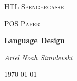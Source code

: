 \documentclass[12pt,a4paper]{report}
\begin{document}
\begin{titlepage}
	\centering
	{\scshape\LARGE HTL Spengergasse \par}
	\vspace{1cm}
	{\scshape\Large POS Paper\par}
	\vspace{1.5cm}
	{\huge\bfseries Language Design\par}
	\vspace{2cm}
	{\Large\itshape Ariel Noah Simulevski\par}
	\vfill

	{\large \today\par}
\end{titlepage}
\end{document}
